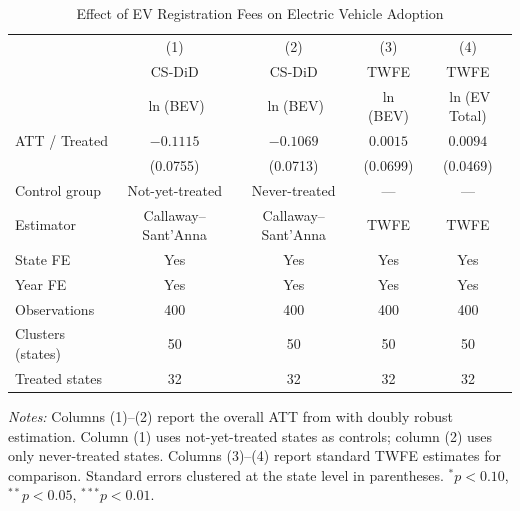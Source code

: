 \begin{table}[t]
\centering
\caption{Effect of EV Registration Fees on Electric Vehicle Adoption}
\label{tab:main}
\begin{tabular}{lcccc}
\toprule
 & (1) & (2) & (3) & (4) \\
 & CS-DiD & CS-DiD & TWFE & TWFE \\
 & $\ln$(BEV) & $\ln$(BEV) & $\ln$(BEV) & $\ln$(EV Total) \\
\midrule
ATT / Treated & $-0.1115$ & $-0.1069$ & $0.0015$ & $0.0094$ \\
 & (0.0755) & (0.0713) & (0.0699) & (0.0469) \\
[4pt]
Control group & Not-yet-treated & Never-treated & --- & --- \\
Estimator & Callaway--Sant'Anna & Callaway--Sant'Anna & TWFE & TWFE \\
State FE & Yes & Yes & Yes & Yes \\
Year FE & Yes & Yes & Yes & Yes \\
\midrule
Observations & 400 & 400 & 400 & 400 \\
Clusters (states) & 50 & 50 & 50 & 50 \\
Treated states & 32 & 32 & 32 & 32 \\
\bottomrule
\end{tabular}
\begin{tablenotes}[flushleft]\small
\item \textit{Notes:} Columns (1)--(2) report the overall ATT from \citet{callaway2021difference} with doubly robust estimation. Column (1) uses not-yet-treated states as controls; column (2) uses only never-treated states. Columns (3)--(4) report standard TWFE estimates for comparison. Standard errors clustered at the state level in parentheses. $^{*}p<0.10$, $^{**}p<0.05$, $^{***}p<0.01$.
\end{tablenotes}
\end{table}

